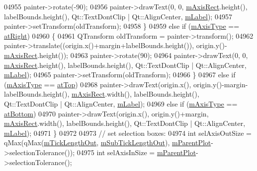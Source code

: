 \begin{DoxyCode}
04955       painter->rotate(-90);
04956       painter->drawText(0, 0, \hyperlink{a00025_ad63d51f30f835f3a568b6231362ed4a0}{mAxisRect}.height(), labelBounds.height(), Qt::TextDontClip | 
      Qt::AlignCenter, \hyperlink{a00025_ae8001dbdfc47685c1cf7b98b044460e6}{mLabel});
04957       painter->setTransform(oldTransform);
04958     \}
04959     \textcolor{keywordflow}{else} \textcolor{keywordflow}{if} (\hyperlink{a00025_ae704bf9f2c2b026f08dd4ccad79c616e}{mAxisType} == \hyperlink{a00025_ae2bcc1728b382f10f064612b368bc18aadf5509f7d29199ef2f263b1dd224b345}{atRight})
04960     \{
04961       QTransform oldTransform = painter->transform();
04962       painter->translate((origin.x()+margin+labelBounds.height()), origin.y()-
      \hyperlink{a00025_ad63d51f30f835f3a568b6231362ed4a0}{mAxisRect}.height());
04963       painter->rotate(90);
04964       painter->drawText(0, 0, \hyperlink{a00025_ad63d51f30f835f3a568b6231362ed4a0}{mAxisRect}.height(), labelBounds.height(), Qt::TextDontClip | 
      Qt::AlignCenter, \hyperlink{a00025_ae8001dbdfc47685c1cf7b98b044460e6}{mLabel});
04965       painter->setTransform(oldTransform);
04966     \}
04967     \textcolor{keywordflow}{else} \textcolor{keywordflow}{if} (\hyperlink{a00025_ae704bf9f2c2b026f08dd4ccad79c616e}{mAxisType} == \hyperlink{a00025_ae2bcc1728b382f10f064612b368bc18aac0ece2b680d3f545e701f75af1655977}{atTop})
04968       painter->drawText(origin.x(), origin.y()-margin-labelBounds.height(), 
      \hyperlink{a00025_ad63d51f30f835f3a568b6231362ed4a0}{mAxisRect}.width(), labelBounds.height(), Qt::TextDontClip | Qt::AlignCenter, 
      \hyperlink{a00025_ae8001dbdfc47685c1cf7b98b044460e6}{mLabel});
04969     \textcolor{keywordflow}{else} \textcolor{keywordflow}{if} (\hyperlink{a00025_ae704bf9f2c2b026f08dd4ccad79c616e}{mAxisType} == \hyperlink{a00025_ae2bcc1728b382f10f064612b368bc18aa220d68888516b6c3b493d144f1ba438f}{atBottom})
04970       painter->drawText(origin.x(), origin.y()+margin, \hyperlink{a00025_ad63d51f30f835f3a568b6231362ed4a0}{mAxisRect}.width(), labelBounds.height(), 
      Qt::TextDontClip | Qt::AlignCenter, \hyperlink{a00025_ae8001dbdfc47685c1cf7b98b044460e6}{mLabel});
04971   \}
04972   
04973   \textcolor{comment}{// set selection boxes:}
04974   \textcolor{keywordtype}{int} selAxisOutSize = qMax(qMax(\hyperlink{a00025_a2951f26d8a504d330157e05063513809}{mTickLengthOut}, \hyperlink{a00025_ae0342609ad543c2667673d75b43d9dbb}{mSubTickLengthOut}), 
      \hyperlink{a00044_aa2a528433e44db02b8aef23c1f9f90ed}{mParentPlot}->selectionTolerance());
04975   \textcolor{keywordtype}{int} selAxisInSize = \hyperlink{a00044_aa2a528433e44db02b8aef23c1f9f90ed}{mParentPlot}->selectionTolerance();

\end{DoxyCode}
